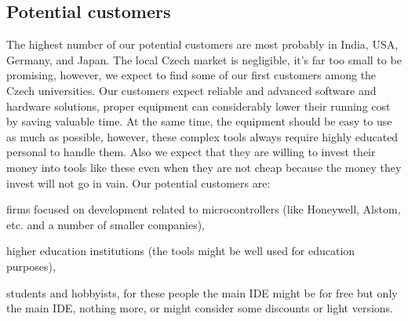 \documentclass[a4paper,twoside,15pt]{book}
\begin{document}
		\subsection{Potential customers}
			The highest number of our potential customers are most probably in India, USA, Germany, and Japan. The local Czech market is negligible, it's far too small to be promising, however, we expect to find some of our first customers among the Czech universities. Our customers expect reliable and advanced software and hardware solutions, proper equipment can considerably lower their running cost by saving valuable time. At the same time, the equipment should be easy to use as much as possible, however, these complex tools always require highly educated personal to handle them. Also we expect that they are willing to invest their money into tools like these even when they are not cheap because the money they invest will not go in vain.
			Our potential customers are:
			\begin{dinglist}{73}
				\item firms focused on development related to microcontrollers (like Honeywell, Alstom, etc. and a number of smaller companies),
				\item higher education institutions (the tools might be well used for education purposes),
				\item students and hobbyists, for these people the main IDE might be for free but only the main IDE, nothing more, or might consider some discounts or light versions.
			\end{dinglist}
\end{document}
